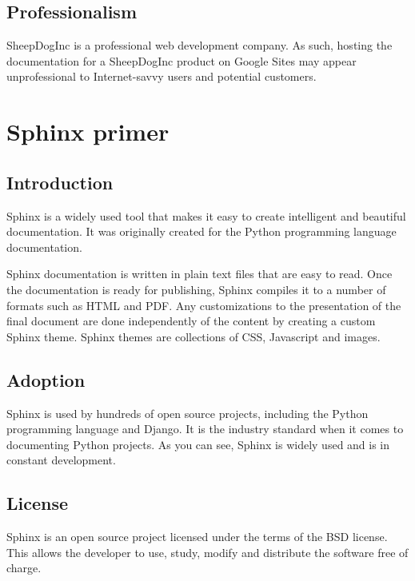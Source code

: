 \documentclass[letterpaper]{report}
\begin{document}
    \subsection*{Professionalism}

        SheepDogInc is a professional web development company. As such, hosting
        the documentation for a SheepDogInc product on Google Sites may appear
        unprofessional to Internet-savvy users and potential customers.

\section*{Sphinx primer}

    \subsection*{Introduction}

        Sphinx is a widely used tool that makes it easy to create intelligent
        and beautiful documentation. It was originally created for the Python
        programming language documentation.

        Sphinx documentation is written in plain text files that are easy to
        read. Once the documentation is ready for publishing, Sphinx compiles
        it to a number of formats such as HTML and PDF. Any customizations to
        the presentation of the final document are done independently of the
        content by creating a custom Sphinx theme. Sphinx themes are
        collections of CSS, Javascript and images.

    \subsection*{Adoption}

        Sphinx is used by hundreds of open source projects, including the
        Python programming language and  Django. It is the industry standard
        when it comes to documenting Python projects. As you can see, Sphinx is
        widely used and is in constant development.

    \subsection*{License}

        Sphinx is an open source project licensed under the terms of the BSD
        license. This allows the developer to use, study, modify and distribute
        the software free of charge.
\end{document}
